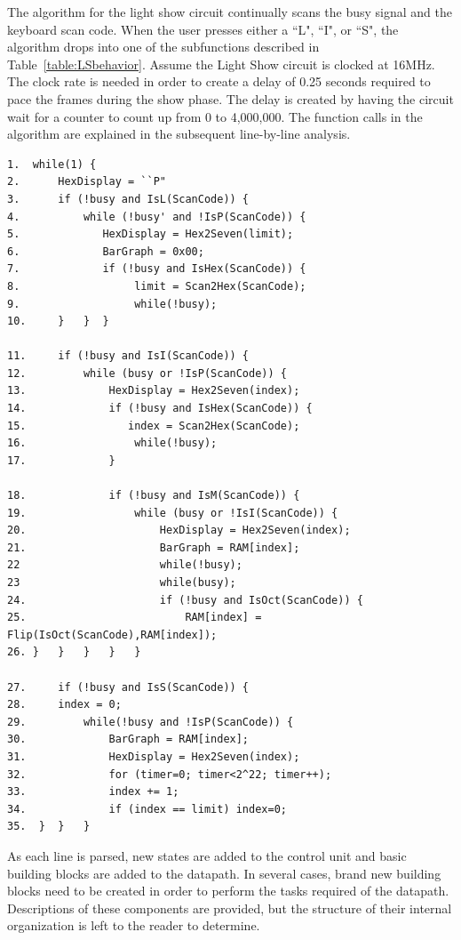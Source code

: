 The algorithm for the light show circuit continually scans the busy signal 
and the keyboard scan code.  When the user presses either a ``L", 
``I", or ``S", 
the algorithm drops into one of the subfunctions described in 
Table~\ref{table:LSbehavior}.  Assume the Light Show circuit is
clocked at 16MHz.  The clock rate is needed in order to create a delay of
0.25 seconds required to pace the frames during the show phase.  The delay is
created by having the circuit wait for a counter to count up from 0 to 
4,000,000.  The function calls in the algorithm are explained in the 
subsequent line-by-line analysis.

\pagebreak
\begin{verbatim}
1.  while(1) {
2.      HexDisplay = ``P"
3.      if (!busy and IsL(ScanCode)) {
4.          while (!busy' and !IsP(ScanCode)) {
5.             HexDisplay = Hex2Seven(limit);
6.             BarGraph = 0x00;
7.             if (!busy and IsHex(ScanCode)) {
8.                  limit = Scan2Hex(ScanCode);
9.                  while(!busy);
10.     }   }  }

11.     if (!busy and IsI(ScanCode)) {
12.         while (busy or !IsP(ScanCode)) {
13.             HexDisplay = Hex2Seven(index);
14.             if (!busy and IsHex(ScanCode)) {
15.                index = Scan2Hex(ScanCode);
16.                 while(!busy);
17.             }

18.             if (!busy and IsM(ScanCode)) {
19.                 while (busy or !IsI(ScanCode)) {
20.                     HexDisplay = Hex2Seven(index);
21.                     BarGraph = RAM[index];
22             	        while(!busy);
23             	        while(busy);
24.                     if (!busy and IsOct(ScanCode)) {
25.                         RAM[index] = Flip(IsOct(ScanCode),RAM[index]);
26.	}   }   }   }   }

27.     if (!busy and IsS(ScanCode)) {
28.	    index = 0;
29.         while(!busy and !IsP(ScanCode)) {
30.             BarGraph = RAM[index];
31.             HexDisplay = Hex2Seven(index);
32.             for (timer=0; timer<2^22; timer++);
33.             index += 1;
34.             if (index == limit) index=0;
35.  }  }   }
\end{verbatim}

As each line is parsed, new states are added to the control unit and basic building 
blocks are added to the datapath.  In several cases, brand new building blocks need 
to be created in order to perform the tasks required of the datapath.  Descriptions of
these components are provided, but the structure of their internal organization 
is left to the reader to determine.

